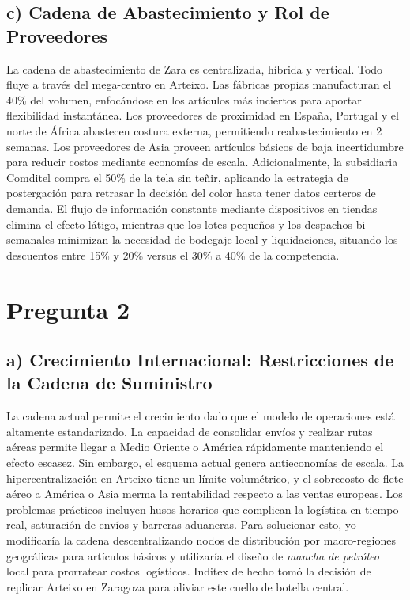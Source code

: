 \documentclass[11pt,a4paper]{article}
\begin{document}
\subsection*{c) Cadena de Abastecimiento y Rol de Proveedores}
La cadena de abastecimiento de Zara es centralizada, híbrida y vertical. Todo fluye a través del mega-centro en Arteixo. Las fábricas propias manufacturan el 40\% del volumen, enfocándose en los artículos más inciertos para aportar flexibilidad instantánea. Los proveedores de proximidad en España, Portugal y el norte de África abastecen costura externa, permitiendo reabastecimiento en 2 semanas. Los proveedores de Asia proveen artículos básicos de baja incertidumbre para reducir costos mediante economías de escala. Adicionalmente, la subsidiaria Comditel compra el 50\% de la tela sin teñir, aplicando la estrategia de postergación para retrasar la decisión del color hasta tener datos certeros de demanda.
El flujo de información constante mediante dispositivos en tiendas elimina el efecto látigo, mientras que los lotes pequeños y los despachos bi-semanales minimizan la necesidad de bodegaje local y liquidaciones, situando los descuentos entre 15\% y 20\% versus el 30\% a 40\% de la competencia.

\newpage

\section*{Pregunta 2}

\subsection*{a) Crecimiento Internacional: Restricciones de la Cadena de Suministro}
La cadena actual permite el crecimiento dado que el modelo de operaciones está altamente estandarizado. La capacidad de consolidar envíos y realizar rutas aéreas permite llegar a Medio Oriente o América rápidamente manteniendo el efecto escasez. 
Sin embargo, el esquema actual genera antieconomías de escala. La hipercentralización en Arteixo tiene un límite volumétrico, y el sobrecosto de flete aéreo a América o Asia merma la rentabilidad respecto a las ventas europeas. Los problemas prácticos incluyen husos horarios que complican la logística en tiempo real, saturación de envíos y barreras aduaneras.
Para solucionar esto, yo modificaría la cadena descentralizando nodos de distribución por macro-regiones geográficas para artículos básicos y utilizaría el diseño de \textit{mancha de petróleo} local para prorratear costos logísticos. Inditex de hecho tomó la decisión de replicar Arteixo en Zaragoza para aliviar este cuello de botella central.
\end{document}
